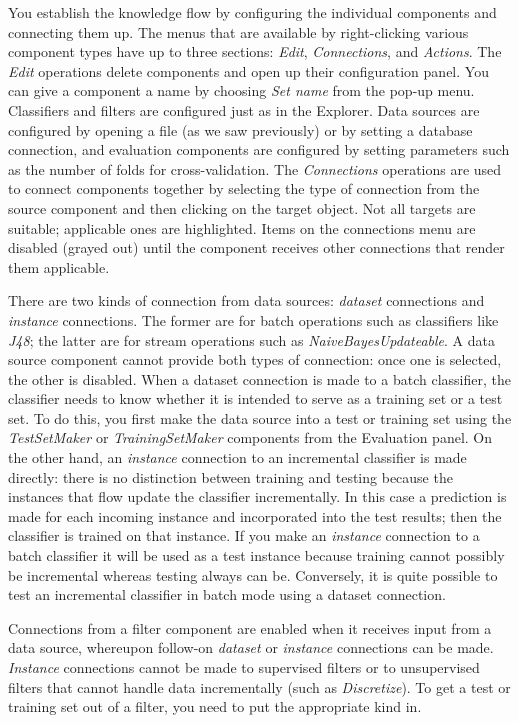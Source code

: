 You establish the knowledge flow by configuring the individual
components and connecting them up. The menus that are available by
right-clicking various component types have up to three sections:
\textit{Edit}, \textit{Connections}, and \textit{Actions}. 
The \textit{Edit} operations delete components and open up their
configuration panel. You can give a component a name by
choosing \textit{Set name} from the pop-up menu. Classifiers
and filters are configured just as in the Explorer. Data sources are
configured by opening a file (as we saw previously) or by setting a
database connection, and evaluation components are configured by
setting parameters such as the number of folds for
cross-validation. The {\em Connections} operations are used to connect
components together by selecting the type of connection from the
source component and then clicking on the target object. Not all
targets are suitable; applicable ones are highlighted. Items on the
connections menu are disabled (grayed out) until the component
receives other connections that render them applicable.

There are two kinds of connection from data sources: \textit{dataset}
connections and \textit{instance} connections. The former are for
batch operations such as classifiers like \textit{J48}; the latter are
for stream operations such as \textit{NaiveBayesUpdateable}. A data
source component cannot provide both types of connection: once one is
selected, the other is disabled. When a dataset connection is made to
a batch classifier, the classifier needs to know whether it is
intended to serve as a training set or a test set. To do this, you
first make the data source into a test or training set using the
\textit{TestSetMaker} or \textit{TrainingSetMaker} components from the Evaluation
panel. On the other hand, an \textit{instance} connection to an
incremental classifier is made directly: there is no distinction
between training and testing because the instances that flow update
the classifier incrementally. In this case a prediction is made for
each incoming instance and incorporated into the test results; then
the classifier is trained on that instance. If you make
an \textit{instance} connection to a batch classifier it will be used
as a test instance because training cannot possibly be incremental
whereas testing always can be. Conversely, it is quite possible to
test an incremental classifier in batch mode using a dataset
connection.

Connections from a filter component are enabled when it receives input
from a data source, whereupon follow-on \textit{dataset}
or \textit{instance} connections can be made. \textit{Instance}
connections cannot be made to supervised filters or to unsupervised
filters that cannot handle data incrementally (such
as \textit{Discretize}). To get a test or training set out of a
filter, you need to put the appropriate kind in.

